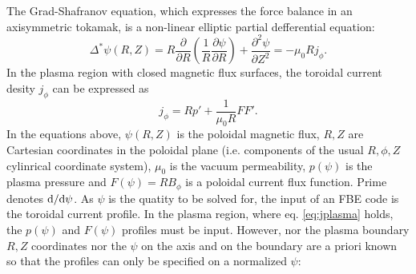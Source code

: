 The Grad-Shafranov equation, which expresses the force balance in an axisymmetric tokamak, is a non-linear elliptic partial defferential equation:
\begin{equation}
\label{eq:gs}
{\Delta ^*}\psi \left( {R,Z} \right) = R\frac{\partial }{{\partial R}}\left( {\frac{1}{R}\frac{{\partial \psi }}{{\partial R}}} \right) + \frac{{{\partial ^2}\psi }}{{\partial {Z^2}}} =  - {\mu _0}R{j_\phi }.
\end{equation}
In the plasma region with closed magnetic flux surfaces, the toroidal current desity $j_\phi$ can be expressed as
\begin{equation}
\label{eq:jplasma}
{j_\phi } = Rp' + \frac{1}{{{\mu _0}R}}FF'.
\end{equation}
In the equations above, $\psi \left( {R,Z} \right)$ is the poloidal magnetic flux, $R,Z$ are Cartesian coordinates in the poloidal plane (i.e. components of the usual $R, \phi , Z$ cylinrical coordinate system), $\mu_0$ is the vacuum permeability, $p\left(\psi\right)$ is the plasma pressure and $F\left(\psi\right) = RB_\phi$ is a poloidal current flux function.
Prime denotes ${\rm{d}}/{{\rm{d}}\psi}$. As $\psi$ is the quatity to be solved for, the input of an FBE code is the toroidal current profile. In the plasma region, where eq. \ref{eq:jplasma} holds, the $p\left(\psi\right)$ and $F\left(\psi\right)$ profiles must be input. However, nor the plasma boundary $R,Z$ coordinates nor the $\psi$ on the axis and on the boundary are a priori known so that the profiles can only be specified on a normalized $\psi$:
